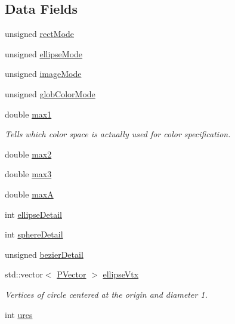 \subsection*{\-Data \-Fields}
\begin{DoxyCompactItemize}
\item 
unsigned \hyperlink{classcprocessing_1_1Style_ad6c53e0b11b150ce9b0d4cda838b21a0}{rect\-Mode}
\item 
unsigned \hyperlink{classcprocessing_1_1Style_ac45b66048241d2ecd1cc45f3d33ee1a9}{ellipse\-Mode}
\item 
unsigned \hyperlink{classcprocessing_1_1Style_ac8e0290066dbe7b14333e8b263d1f3b2}{image\-Mode}
\item 
unsigned \hyperlink{classcprocessing_1_1Style_a03938147fd7720cb4e3370db07840770}{glob\-Color\-Mode}
\item 
double \hyperlink{classcprocessing_1_1Style_a7eec2077d120edee546ef5c396bd76b4}{max1}
\begin{DoxyCompactList}\small\item\em \-Tells which color space is actually used for color specification. \end{DoxyCompactList}\item 
double \hyperlink{classcprocessing_1_1Style_ab398d4a05ab2a554d5856f6394a3908c}{max2}
\item 
double \hyperlink{classcprocessing_1_1Style_addd5a8e8c0b252f452a0a20f37db4976}{max3}
\item 
double \hyperlink{classcprocessing_1_1Style_a6c84aee2964e963e5d4a398fecb6820e}{max\-A}
\item 
int \hyperlink{classcprocessing_1_1Style_ab57be3369f09dda4193bd28665776155}{ellipse\-Detail}
\item 
int \hyperlink{classcprocessing_1_1Style_ae4228a0d8904da20016816b72773722e}{sphere\-Detail}
\item 
unsigned \hyperlink{classcprocessing_1_1Style_af066cb110b19a792122f230f11c7cf57}{bezier\-Detail}
\item 
std\-::vector$<$ \hyperlink{classcprocessing_1_1PVector}{\-P\-Vector} $>$ \hyperlink{classcprocessing_1_1Style_a42743879ae50e0d629ecb1f3adfd5326}{ellipse\-Vtx}
\begin{DoxyCompactList}\small\item\em \-Vertices of circle centered at the origin and diameter 1. \end{DoxyCompactList}\item 
int \hyperlink{classcprocessing_1_1Style_a273318013798fe01a929a718089bcd41}{ures}

\end{DoxyCompactItemize}
